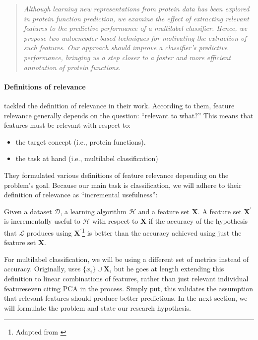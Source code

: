 \begin{quote}
  \itshape
  \small
  Although learning new representations from protein data has been explored
  in protein function prediction, we examine the effect of extracting
  relevant features to the predictive performance of a multilabel classifier.
  Hence, we propose two autoencoder-based techniques for motivating the
  extraction of such features. Our approach should improve a classifier's
  predictive performance, bringing us a step closer to a faster and more
  efficient annotation of protein functions.
\end{quote}

\paragraph{Definitions of relevance}
\cite{blum1997selection} tackled the definition of relevance in their work.
According to them, feature relevance generally depends on the question:
``relevant to what?'' This means that features must be relevant
with respect to:
\begin{itemize}
  \item the target concept (i.e., protein functions). 
  \item the task at hand (i.e., multilabel classification)
\end{itemize}

\par They formulated various definitions of feature relevance depending on the
problem's goal. Because our main task is classification, we will adhere to
their definition of relevance as ``incremental usefulness'':

\begin{definition}
  \label{DefRelevance}
   Given a dataset $\mathcal{D}$, a learning algorithm $\mathcal{H}$ and a
   feature set $\mathbf{X}$. A feature set $\mathbf{X}^{\prime}$ is
   incrementally useful to $\mathcal{H}$ with respect to $\mathbf{X}$ if the
   accuracy of the hypothesis that $\mathcal{L}$ produces using
   $\mathbf{X}^{\prime}$\footnote{Adapted from \cite{blum1997selection}}
   is better than the accuracy achieved using just the
   feature set $\mathbf{X}$.
\end{definition}

\par\noindent For multilabel classification, we will be using a different set
of metrics instead of accuracy. Originally, \cite{blum1997selection} uses
$\{x_{i}\} \cup \mathbf{X}$, but he goes at length extending this definition
to linear combinations of features, rather than just relevant individual
features\textemdash even citing PCA in the process. Simply put, this
validates the assumption that relevant features should produce better
predictions. In the next section, we will formulate the problem and state our
research hypothesis.

